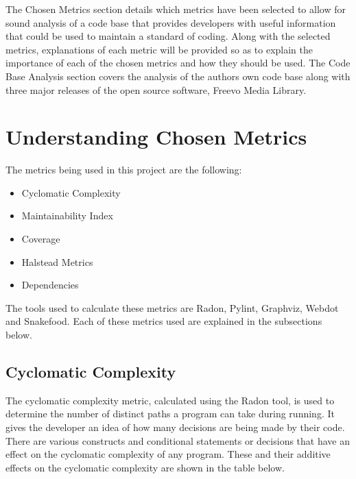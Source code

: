 \documentclass[10.5pt,journal, a4paper]{IEEEtran}
\begin{document}
\noindent
The Chosen Metrics section details which metrics have been selected to allow for sound analysis of a code base that provides developers with useful information that could be used to maintain a standard of coding. Along with the selected metrics, explanations of each metric will be provided so as to explain the importance of each of the chosen metrics and how they should be used. The Code Base Analysis section covers the analysis of the authors own code base along with three major releases of the open source software, Freevo Media Library. 



\section{Understanding Chosen Metrics}
\noindent
The metrics being used in this project are the following:
\begin{itemize}
\item Cyclomatic Complexity
\item Maintainability Index
\item Coverage
\item Halstead Metrics
\item Dependencies
\end{itemize}
\noindent
The tools used to calculate these metrics are Radon, Pylint, Graphviz, Webdot and Snakefood. Each of these metrics used are explained in the subsections below.

\subsection{Cyclomatic Complexity}
\noindent
The cyclomatic complexity metric, calculated using the Radon tool, is used to determine the number of distinct paths a program can take during running. It gives the developer an idea of how many decisions are being made by their code. There are various constructs and conditional statements or decisions that have an effect on the cyclomatic complexity of any program. These and their additive  effects on the cyclomatic complexity are shown in the table below. 
\end{document}
